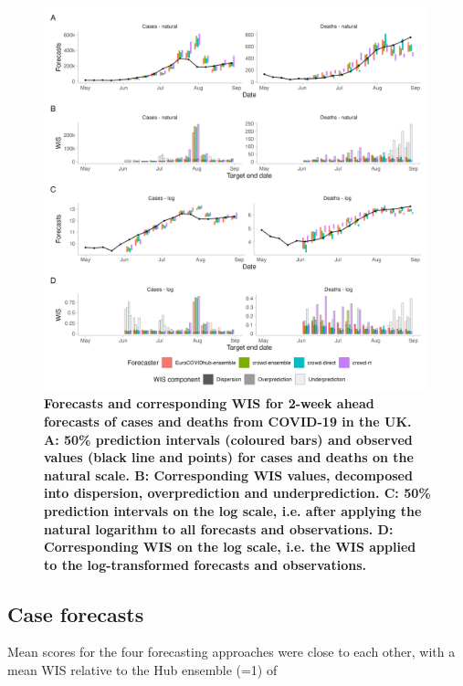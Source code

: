 \documentclass[10pt,a4paper,twocolumn]{article}
\begin{document}
\begin{figure}
\centering
\includegraphics[width=0.99\textwidth]{../output/figures/scores-and-forecasts.png}
\caption{\bf{Forecasts and corresponding WIS for 2-week ahead forecasts of cases and deaths from COVID-19 in the UK.} A: 50\% prediction intervals (coloured bars) and observed values (black line and points) for cases and deaths on the natural scale. B: Corresponding WIS values, decomposed into dispersion, overprediction and underprediction. C: 50\% prediction intervals on the log scale, i.e. after applying the natural logarithm to all forecasts and observations. D: Corresponding WIS on the log scale, i.e. the WIS applied to the log-transformed forecasts and observations.} 
\label{fig:forecasts-scores} 
\end{figure}

\subsection*{Case forecasts}

Mean scores for the four forecasting approaches were close to each other, with a mean WIS relative to the Hub ensemble (=1) of 
\end{document}
